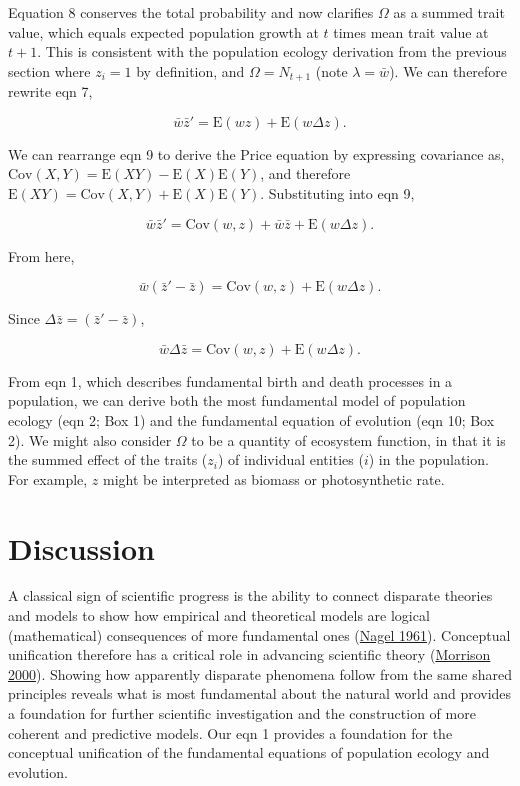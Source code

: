 \documentclass[
]{article}
\begin{document}
Equation 8 conserves the total probability and now clarifies \(\Omega\)
as a summed trait value, which equals expected population growth at
\(t\) times mean trait value at \(t + 1\). This is consistent with the
population ecology derivation from the previous section where
\(z_{i} = 1\) by definition, and \(\Omega = N_{t+1}\) (note
\(\lambda = \bar{w}\)). We can therefore rewrite eqn 7,

\[\bar{w}\bar{z}' = \mathrm{E}\left(w z \right) + \mathrm{E}\left( w \Delta z  \right).
\tag{9}
\]

We can rearrange eqn 9 to derive the Price equation by expressing
covariance as,
\(\mathrm{Cov}(X,Y) = \mathrm{E}(XY) - \mathrm{E}(X)\mathrm{E}(Y)\), and
therefore
\(\mathrm{E}(XY) = \mathrm{Cov}(X,Y) + \mathrm{E}(X)\mathrm{E}(Y)\).
Substituting into eqn 9,

\[\bar{w}\bar{z}' = \mathrm{Cov}\left(w ,z \right) + \bar{w}\bar{z} + \mathrm{E}\left( w \Delta z  \right).\]

From here,

\[\bar{w}\left(\bar{z}' - \bar{z}\right) = \mathrm{Cov}\left(w ,z \right) + \mathrm{E}\left( w \Delta z  \right).\]

Since \(\Delta \bar{z} = \left(\bar{z}' - \bar{z}\right)\),

\[\bar{w}\Delta \bar{z} = \mathrm{Cov}\left(w ,z \right) + \mathrm{E}\left( w \Delta z  \right).
\tag{10}
\]

From eqn 1, which describes fundamental birth and death processes in a
population, we can derive both the most fundamental model of population
ecology (eqn 2; Box 1) and the fundamental equation of evolution (eqn
10; Box 2). We might also consider \(\Omega\) to be a quantity of
ecosystem function, in that it is the summed effect of the traits
(\(z_{i}\)) of individual entities (\(i\)) in the population. For
example, \(z\) might be interpreted as biomass or photosynthetic rate.

\hypertarget{discussion}{%
\section{Discussion}\label{discussion}}

A classical sign of scientific progress is the ability to connect
disparate theories and models to show how empirical and theoretical
models are logical (mathematical) consequences of more fundamental ones
(\protect\hyperlink{ref-Nagel1961}{Nagel 1961}). Conceptual unification
therefore has a critical role in advancing scientific theory
(\protect\hyperlink{ref-Morrison2000}{Morrison 2000}). Showing how
apparently disparate phenomena follow from the same shared principles
reveals what is most fundamental about the natural world and provides a
foundation for further scientific investigation and the construction of
more coherent and predictive models. Our eqn 1 provides a foundation for
the conceptual unification of the fundamental equations of population
ecology and evolution.
\end{document}
